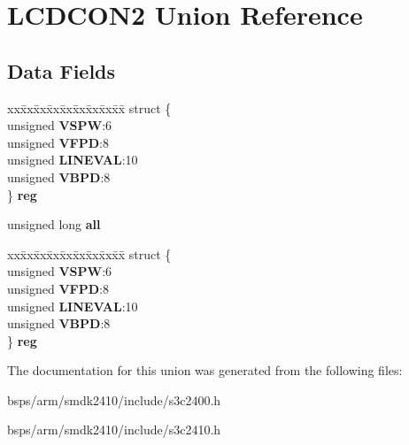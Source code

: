 \hypertarget{unionLCDCON2}{}\section{L\+C\+D\+C\+O\+N2 Union Reference}
\label{unionLCDCON2}
\subsection*{Data Fields}
\begin{DoxyCompactItemize}
\item 
\mbox{\label{unionLCDCON2_a5e22d8e0a296a9bdaad9eec4c3a68ee4}} 
\begin{tabbing}
xx\=xx\=xx\=xx\=xx\=xx\=xx\=xx\=xx\=\kill
struct \{\\
\>unsigned {\bfseries VSPW}:6\\
\>unsigned {\bfseries VFPD}:8\\
\>unsigned {\bfseries LINEVAL}:10\\
\>unsigned {\bfseries VBPD}:8\\
\} {\bfseries reg}\\

\end{tabbing}\item 
\mbox{\label{unionLCDCON2_a2a622c673e96b3c50f51d53612430235}} 
unsigned long {\bfseries all}
\item 
\mbox{\label{unionLCDCON2_a816c9a993ddf8bb41e12d6ee1c341475}} 
\begin{tabbing}
xx\=xx\=xx\=xx\=xx\=xx\=xx\=xx\=xx\=\kill
struct \{\\
\>unsigned {\bfseries VSPW}:6\\
\>unsigned {\bfseries VFPD}:8\\
\>unsigned {\bfseries LINEVAL}:10\\
\>unsigned {\bfseries VBPD}:8\\
\} {\bfseries reg}\\

\end{tabbing}\end{DoxyCompactItemize}


The documentation for this union was generated from the following files\+:\begin{DoxyCompactItemize}
\item 
bsps/arm/smdk2410/include/s3c2400.\+h\item 
bsps/arm/smdk2410/include/s3c2410.\+h\end{DoxyCompactItemize}
